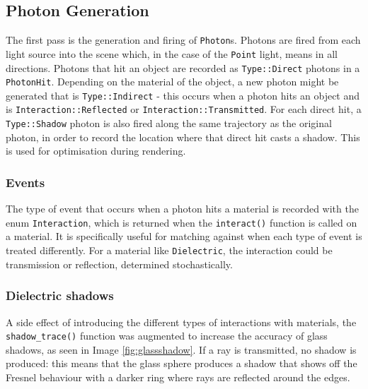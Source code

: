 \documentclass[a4paper]{article}
\begin{document}
\subsection{Photon Generation}
The first pass is the generation and firing of \texttt{Photon}s. Photons are fired from each light source into the scene which, in the case of the \texttt{Point} light, means in all directions. Photons that hit an object are recorded as \texttt{Type::Direct} photons in a \texttt{PhotonHit}. Depending on the material of the object, a new photon might be generated that is \texttt{Type::Indirect} - this occurs when a photon hits an object and is \texttt{Interaction::Reflected} or \texttt{Interaction::Transmitted}. For each direct hit, a \texttt{Type::Shadow} photon is also fired along the same trajectory as the original photon, in order to record the location where that direct hit casts a shadow. This is used for optimisation during rendering.

\subsubsection{Events}
The type of event that occurs when a photon hits a material is recorded with the enum \texttt{Interaction}, which is returned when the \texttt{interact()} function is called on a material. It is specifically useful for matching against when each type of event is treated differently. For a material like \texttt{Dielectric}, the interaction could be transmission or reflection, determined stochastically.

\subsubsection{Dielectric shadows}
A side effect of introducing the different types of interactions with materials, the \texttt{shadow\_trace()} function was augmented to increase the accuracy of glass shadows, as seen in Image \ref{fig:glassshadow}. If a ray is transmitted, no shadow is produced: this means that the glass sphere produces a shadow that shows off the Fresnel behaviour with a darker ring where rays are reflected around the edges.
\end{document}
